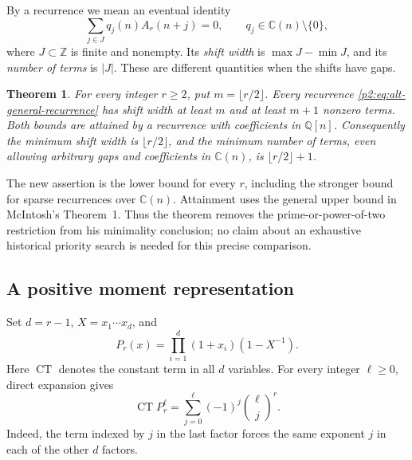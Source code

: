 \documentclass[11pt,a4paper]{article}
\newtheorem{theorem}{Theorem}[section]
\theoremstyle{definition}
\theoremstyle{remark}
\numberwithin{equation}{section}
\begin{document}
By a recurrence we mean an eventual identity
\begin{equation}\label{p2:eq:alt-general-recurrence}
 \sum_{j\in J}q_j(n)A_r(n+j)=0,
 \qquad q_j\in\mathbb C(n)\setminus\{0\},
\end{equation}
where $J\subset\mathbb Z$ is finite and nonempty. Its \emph{shift width}
is $\max J-\min J$, and its \emph{number of terms} is $|J|$.
These are different quantities when the shifts have gaps.

\begin{theorem}\label{p2:thm:alt-minimality}
For every integer $r\geq2$, put $m=\lfloor r/2\rfloor$.
Every recurrence \eqref{p2:eq:alt-general-recurrence} has shift width at
least $m$ and at least $m+1$ nonzero terms. Both bounds are attained by
a recurrence with coefficients in $\mathbb Q[n]$.
Consequently the minimum shift width is $\lfloor r/2\rfloor$, and the
minimum number of terms, even allowing arbitrary gaps and coefficients
in $\mathbb C(n)$, is $\lfloor r/2\rfloor+1$.
\end{theorem}

The new assertion is the lower bound for every $r$, including the stronger
bound for sparse recurrences over $\mathbb C(n)$. Attainment uses the
general upper bound in McIntosh's Theorem~1. Thus the theorem removes the
prime-or-power-of-two restriction from his minimality conclusion; no
claim about an exhaustive historical priority search is needed for this
precise comparison.

\subsection{A positive moment representation}

Set $d=r-1$, $X=x_1\cdots x_d$, and
\begin{equation}\label{p2:eq:alt-laurent}
 P_r(x)=\prod_{i=1}^{d}(1+x_i)(1-X^{-1}).
\end{equation}
Here $\operatorname{CT}$ denotes the constant term in all $d$ variables.
For every integer $\ell\geq0$, direct expansion gives
\begin{equation}\label{p2:eq:alt-ct}
 \operatorname{CT}P_r^{\ell}
 =\sum_{j=0}^{\ell}(-1)^j\binom{\ell}{j}^{r}.
\end{equation}
Indeed, the term indexed by $j$ in the last factor forces the same
exponent $j$ in each of the other $d$ factors.
\end{document}
